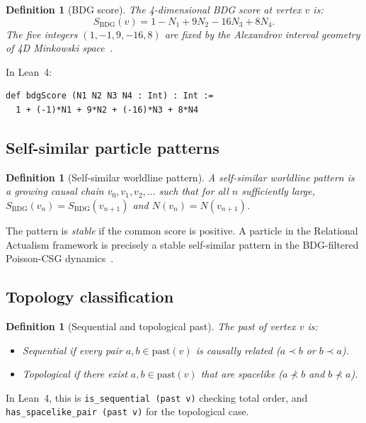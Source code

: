 \documentclass[11pt,a4paper]{article}
\newtheorem{definition}[theorem]{Definition}
\newcommand{\SBDG}{S_{\mathrm{BDG}}}
\begin{document}
\begin{definition}[BDG score]
The 4-dimensional BDG score at vertex $v$ is:
\[
  \SBDG(v) = 1 - N_1 + 9N_2 - 16N_3 + 8N_4.
\]
The five integers $(1,-1,9,-16,8)$ are fixed by the Alexandrov interval
geometry of 4D Minkowski space~\citep{Benincasa2010}.
\end{definition}

In Lean~4:
\begin{verbatim}
def bdgScore (N1 N2 N3 N4 : Int) : Int :=
  1 + (-1)*N1 + 9*N2 + (-16)*N3 + 8*N4
\end{verbatim}

\subsection{Self-similar particle patterns}

\begin{definition}[Self-similar worldline pattern]
A \emph{self-similar worldline pattern} is a growing causal chain
$v_0, v_1, v_2, \ldots$ such that for all $n$ sufficiently large,
$\SBDG(v_n) = \SBDG(v_{n+1})$ and $N(v_n) = N(v_{n+1})$.
\end{definition}

The pattern is \emph{stable} if the common score is positive.
A particle in the Relational Actualism framework is precisely a stable
self-similar pattern in the BDG-filtered Poisson-CSG
dynamics~\citep{Sandeman2026RASM}.

\subsection{Topology classification}

\begin{definition}[Sequential and topological past]
The past of vertex $v$ is:
\begin{itemize}[noitemsep]
  \item \emph{Sequential} if every pair $a,b \in \mathrm{past}(v)$ is
    causally related ($a \prec b$ or $b \prec a$).
  \item \emph{Topological} if there exist $a,b \in \mathrm{past}(v)$
    that are spacelike ($a \not\prec b$ and $b \not\prec a$).
\end{itemize}
\end{definition}

In Lean~4, this is \texttt{is\_sequential (past v)} checking total order,
and \texttt{has\_spacelike\_pair (past v)} for the topological case.
\end{document}
